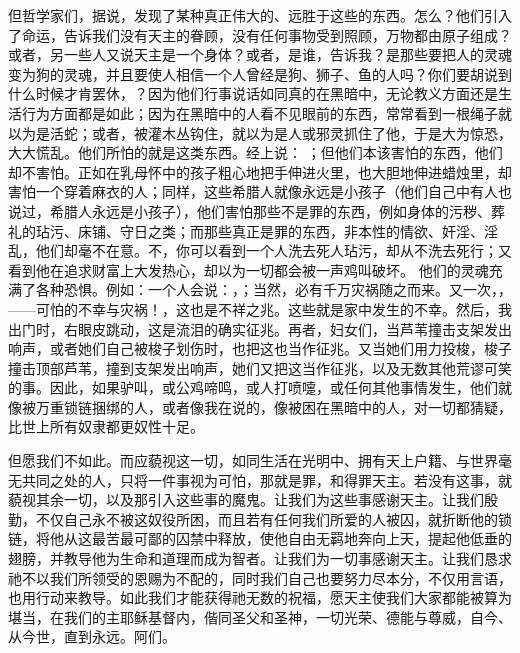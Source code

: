 但哲学家们，据说，发现了某种真正伟大的、远胜于这些的东西。怎么？他们引入了命运，告诉我们没有天主的眷顾，没有任何事物受到照顾，万物都由原子组成？或者，另一些人又说天主是一个身体？或者，是谁，告诉我？是那些要把人的灵魂变为狗的灵魂，并且要使人相信一个人曾经是狗、狮子、鱼的人吗？你们要胡说到什么时候才肯罢休，？因为他们行事说话如同真的在黑暗中，无论教义方面还是生活行为方面都是如此；因为在黑暗中的人看不见眼前的东西，常常看到一根绳子就以为是活蛇；或者，被灌木丛钩住，就以为是人或邪灵抓住了他，于是大为惊恐，大大慌乱。他们所怕的就是这类东西。经上说： ；但他们本该害怕的东西，他们却不害怕。正如在乳母怀中的孩子粗心地把手伸进火里，也大胆地伸进蜡烛里，却害怕一个穿着麻衣的人；同样，这些希腊人就像永远是小孩子（他们自己中有人也说过，希腊人永远是小孩子），他们害怕那些不是罪的东西，例如身体的污秽、葬礼的玷污、床铺、守日之类；而那些真正是罪的东西，非本性的情欲、奸淫、淫乱，他们却毫不在意。不，你可以看到一个人洗去死人玷污，却从不洗去死行；又看到他在追求财富上大发热心，却以为一切都会被一声鸡叫破坏。 他们的灵魂充满了各种恐惧。例如：一个人会说：，；当然，必有千万灾祸随之而来。又一次，，——可怕的不幸与灾祸！，这也是不祥之兆。这些就是家中发生的不幸。然后，我出门时，右眼皮跳动，这是流泪的确实征兆。再者，妇女们，当芦苇撞击支架发出响声，或者她们自己被梭子划伤时，也把这也当作征兆。又当她们用力投梭，梭子撞击顶部芦苇，撞到支架发出响声，她们又把这当作征兆，以及无数其他荒谬可笑的事。因此，如果驴叫，或公鸡啼鸣，或人打喷嚏，或任何其他事情发生，他们就像被万重锁链捆绑的人，或者像我在说的，像被困在黑暗中的人，对一切都猜疑，比世上所有奴隶都更奴性十足。\par

但愿我们不如此。而应藐视这一切，如同生活在光明中、拥有天上户籍、与世界毫无共同之处的人，只将一件事视为可怕，那就是罪，和得罪天主。若没有这事，就藐视其余一切，以及那引入这些事的魔鬼。让我们为这些事感谢天主。让我们殷勤，不仅自己永不被这奴役所困，而且若有任何我们所爱的人被囚，就折断他的锁链，将他从这最苦最可鄙的囚禁中释放，使他自由无羁地奔向上天，提起他低垂的翅膀，并教导他为生命和道理而成为智者。让我们为一切事感谢天主。让我们恳求祂不以我们所领受的恩赐为不配的，同时我们自己也要努力尽本分，不仅用言语，也用行动来教导。如此我们才能获得祂无数的祝福，愿天主使我们大家都能被算为堪当，在我们的主耶稣基督内，偕同圣父和圣神，一切光荣、德能与尊威，自今、从今世，直到永远。阿们。\par

